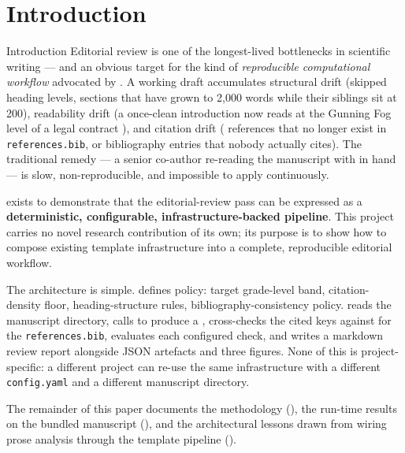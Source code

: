\documentclass[
  ignorenonframetext,
]{beamer}
\author{\texorpdfstring{}{}}
\date{}
\begin{document}
\section{Introduction}\label{sec:introduction}

\begin{frame}{Introduction}
Editorial review is one of the longest-lived bottlenecks in scientific
writing --- and an obvious target for the kind of \emph{reproducible
computational workflow} advocated by . A
working draft accumulates structural drift (skipped heading levels,
sections that have grown to 2,000 words while their siblings sit at
200), readability drift (a once-clean introduction now reads at the
Gunning Fog level of a legal contract ), and
citation drift (\texttt{\breakseq{[@key]}} references that no longer exist in
\texttt{references.bib}, or bibliography entries that nobody actually
cites). The traditional remedy --- a senior co-author re-reading the
manuscript with  in hand --- is slow,
non-reproducible, and impossible to apply continuously.

 exists to demonstrate that the
editorial-review pass can be expressed as a \textbf{deterministic,
configurable, infrastructure-backed pipeline}. This project carries no
novel research contribution of its own; its purpose is to show how to
compose existing template infrastructure into a complete, reproducible
editorial workflow.

The architecture is simple.  defines
policy: target grade-level band, citation-density floor,
heading-structure rules, bibliography-consistency policy.
 reads the
manuscript directory, calls
\href{../../../../infrastructure/prose/SKILL.md}{}
to produce a , cross-checks the cited keys
against
\href{../../../../infrastructure/reference/citation/SKILL.md}{}
for the \texttt{references.bib}, evaluates each configured check, and
writes a markdown review report alongside JSON artefacts and three
figures. None of this is project-specific: a different project can
re-use the same infrastructure with a different \texttt{config.yaml} and
a different manuscript directory.

The remainder of this paper documents the methodology
(), the run-time results on the bundled manuscript
(), and the architectural lessons drawn from wiring
prose analysis through the template pipeline ().
\end{frame}
\end{document}
